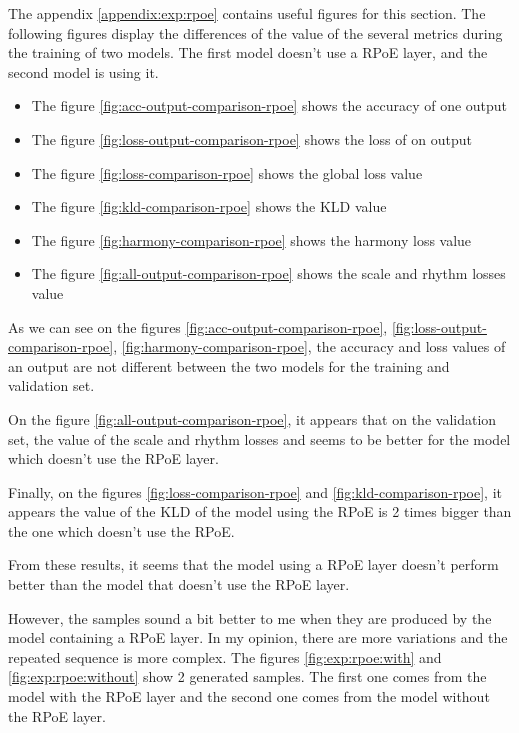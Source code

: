 \documentclass[12pt]{report}
\begin{document}
The appendix \ref{appendix:exp:rpoe} contains useful figures for this section.
The following figures display the differences of the value of the several metrics during the training of two models.
The first model doesn't use a RPoE layer, and the second model is using it.
\begin{itemize}
    \item The figure \ref{fig:acc-output-comparison-rpoe} shows the accuracy of one output
    \item The figure \ref{fig:loss-output-comparison-rpoe} shows the loss of on output
    \item The figure \ref{fig:loss-comparison-rpoe} shows the global loss value
    \item The figure \ref{fig:kld-comparison-rpoe} shows the KLD value
    \item The figure \ref{fig:harmony-comparison-rpoe} shows the harmony loss value
    \item The figure \ref{fig:all-output-comparison-rpoe} shows the scale and rhythm losses value
\end{itemize}

As we can see on the figures \ref{fig:acc-output-comparison-rpoe}, \ref{fig:loss-output-comparison-rpoe}, \ref{fig:harmony-comparison-rpoe}, the accuracy and loss values of an output are not different between the two models for the training and validation set.

On the figure \ref{fig:all-output-comparison-rpoe}, it appears that on the validation set, the value of the scale and rhythm losses and seems to be better for the model which doesn't use the RPoE layer.

Finally, on the figures \ref{fig:loss-comparison-rpoe} and \ref{fig:kld-comparison-rpoe}, it appears the value of the KLD of the model using the RPoE is 2 times bigger than the one which doesn't use the RPoE.

From these results, it seems that the model using a RPoE layer doesn't perform better than the model that doesn't use the RPoE layer.

However, the samples sound a bit better to me when they are produced by the model containing a RPoE layer.
In my opinion, there are more variations and the repeated sequence is more complex.
The figures \ref{fig:exp:rpoe:with} and \ref{fig:exp:rpoe:without} show 2 generated samples.
The first one comes from the model with the RPoE layer and the second one comes from the model without the RPoE layer.
\end{document}
